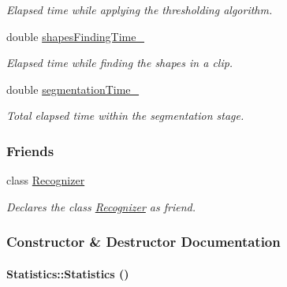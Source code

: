 \begin{CompactItemize}
\begin{CompactList}\small\item\em Elapsed time while applying the thresholding algorithm. \item\end{CompactList}\item 
\hypertarget{class_statistics_902172424d5011a89726319dfd32fa19}{
double \hyperlink{class_statistics_902172424d5011a89726319dfd32fa19}{shapesFindingTime\_\-}}
\label{class_statistics_902172424d5011a89726319dfd32fa19}

\begin{CompactList}\small\item\em Elapsed time while finding the shapes in a clip. \item\end{CompactList}\item 
\hypertarget{class_statistics_89ff84bd9b9b80585822c461ec25c8eb}{
double \hyperlink{class_statistics_89ff84bd9b9b80585822c461ec25c8eb}{segmentationTime\_\-}}
\label{class_statistics_89ff84bd9b9b80585822c461ec25c8eb}

\begin{CompactList}\small\item\em Total elapsed time within the segmentation stage. \item\end{CompactList}\end{CompactItemize}
\subsubsection*{Friends}
\begin{CompactItemize}
\item 
\hypertarget{class_statistics_11123fa51c07995419270030024a7dfe}{
class \hyperlink{class_statistics_11123fa51c07995419270030024a7dfe}{Recognizer}}
\label{class_statistics_11123fa51c07995419270030024a7dfe}

\begin{CompactList}\small\item\em Declares the class \hyperlink{class_recognizer}{Recognizer} as friend. \item\end{CompactList}\end{CompactItemize}


\subsubsection{Constructor \& Destructor Documentation}
\hypertarget{class_statistics_60ddd90a571ed4c3ce8c0f6317a36d63}{
\paragraph[Statistics]{\setlength{\rightskip}{0pt plus 5cm}Statistics::Statistics ()}\hfill}
\label{class_statistics_60ddd90a571ed4c3ce8c0f6317a36d63}



